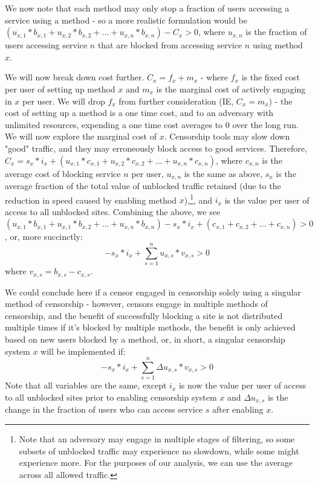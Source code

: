 \documentclass[12pt]{report}
\begin{document}
We now note that each method may only stop a fraction of users accessing a service using a method - so a more realistic formulation would be $(u_{x,1}*b_{x,1} + u_{x,2}*b_{x,2} + ... + u_{x,n}*b_{x,n}) - C_x > 0$, where $u_{x,n}$ is the fraction of users accessing service $n$ that are blocked from accessing service $n$ using method $x$.

We will now break down cost further. $C_x = f_x + m_x$ - where $f_x$ is the fixed cost per user of setting up method $x$ and $m_x$ is the marginal cost of actively engaging in $x$ per user. We will drop $f_x$ from further consideration (IE, $C_x = m_x$) - the cost of setting up a method is a one time cost, and to an adversary with unlimited resources, expending a one time cost averages to $0$ over the long run. We will now explore the marginal cost of $x$. Censorship tools may slow down "good" traffic, and they may erroneously block access to good services. Therefore, $C_x = s_x*i_x + (u_{x,1}*c_{x,1} + u_{x,2}*c_{x,2} + ...  + u_{x,n}*c_{x,n})$, where $c_{x,n}$ is the average cost of blocking service $n$ per user, $u_{x,n}$ is the same as above, $s_x$ is the average fraction of the total value of unblocked traffic retained (due to the reduction in speed caused by enabling method $x$),\footnote{Note that an adversary may engage in multiple stages of filtering, so some subsets of unblocked traffic may experience no slowdown, while some might experience more. For the purposes of our analysis, we can use the average across all allowed traffic.}, and $i_x$ is the value per user of access to all unblocked sites. Combining the above, we see
$(u_{x,1}*b_{x,1} + u_{x,1}*b_{x,2} + ... + u_{x,n}*b_{x,n}) - s_x*i_x + (c_{x,1} + c_{x,2} + ...  + c_{x,n}) > 0$, or, more succinctly:
\begin{equation}
-s_x*i_x + \sum_{s=1}^{n}u_{x,s}*v_{x,s} > 0
\end{equation}
where $v_{x,s} = b_{x,s} - c_{x,s}$.

We could conclude here if a censor engaged in censorship solely using a singular method of censorship - however, censors engage in multiple methods of censorship, and the benefit of successfully blocking a site is not distributed multiple times if it's blocked by multiple methods, the benefit is only achieved based on new users blocked by a method, or, in short, a singular censorship system $x$ will be implemented if:
\begin{equation}
-s_x*i_x + \sum_{s=1}^{n}\Delta u_{x,s}*v_{x,s} > 0
\end{equation}
Note that all variables are the same, except $i_x$ is now the value per user of access to all unblocked sites prior to enabling censorship system $x$ and $\Delta u_{x,s}$ is the change in the fraction of users who can access service $s$ after enabling $x$.
\end{document}
